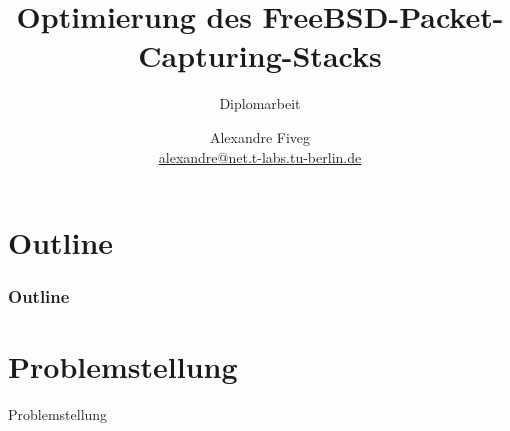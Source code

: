 \documentclass{beamer}
\title{Optimierung des FreeBSD-Packet-Capturing-Stacks}
\subtitle{Diplomarbeit}
\author[Alexandre Fiveg]{ Alexandre Fiveg \\
\url{alexandre@net.t-labs.tu-berlin.de} }
\institute[TU Berlin/DT Labs]{Technische Universtit\"at Berlin \\ Deutsche Telekom Laboratories}
\begin{document}
\frame{\titlepage}

\section*{Outline}

\begin{frame}
\frametitle{Outline}
\tableofcontents
\end{frame}




\section{Problemstellung}

\begin{frame}
	\begin{center}
	\huge{Problemstellung}
	\end{center}
\end{frame}

\end{document}
